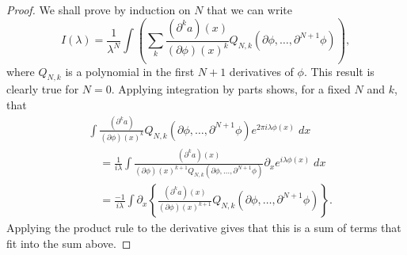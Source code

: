 \begin{proof}
  We shall prove by induction on $N$ that we can write
  \[ I(\lambda) = \frac{1}{\lambda^N} \int \left( \sum_k \frac{(\partial^k a)(x)}{(\partial \phi)(x)^k} Q_{N,k}(\partial \phi, \dots, \partial^{N+1} \phi) \right), \]
  where $Q_{N,k}$ is a polynomial in the first $N+1$ derivatives of $\phi$. This result is clearly true for $N = 0$. Applying integration by parts shows, for a fixed $N$ and $k$, that
  \begin{align*}
    &\int \frac{(\partial^k a)}{(\partial \phi)(x)^k} Q_{N,k}(\partial \phi, \dots, \partial^{N+1} \phi) e^{2 \pi i \lambda \phi(x)}\; dx\\
    &\quad = \frac{1}{i \lambda} \int \frac{(\partial^k a)(x)}{(\partial \phi)(x)^{k+1} Q_{N,k}(\partial \phi, \dots, \partial^{N+1} \phi)} \partial_x e^{i \lambda \phi(x)}\; dx\\
    &\quad = \frac{-1}{i \lambda} \int \partial_x \left\{ \frac{(\partial^k a)(x)}{(\partial \phi)(x)^{k+1}} Q_{N,k}(\partial \phi, \dots, \partial^{N+1} \phi) \right\}.
  \end{align*}
  Applying the product rule to the derivative gives that this is a sum of terms that fit into the sum above.
\end{proof}

